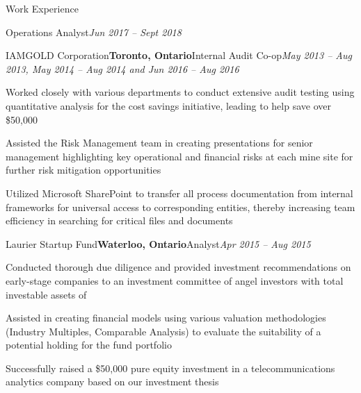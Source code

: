 \documentclass{resume} %
\begin{document}
\begin{rSection}{Work Experience}
\begin{pSubsection}{Operations Analyst}{\emph {Jun 2017 -- Sept 2018}}
\end{pSubsection}

\medskip

\begin{rSubsection}{IAMGOLD Corporation}{\bf Toronto, Ontario}{Internal Audit Co-op}{\emph {May 2013 -- Aug 2013, May 2014 -- Aug 2014 and Jun 2016 -- Aug 2016}}
\smallskip
\item Worked closely with various departments to conduct extensive audit testing using quantitative analysis for the cost savings initiative, leading to help save over \$50,000
\item Assisted the Risk Management team in creating presentations for senior management highlighting key operational and financial risks at each mine site for further risk mitigation opportunities
\item Utilized Microsoft SharePoint to transfer all process documentation from internal frameworks for universal access to corresponding entities, thereby increasing team efficiency in searching for critical files and documents 

\end{rSubsection}

\medskip

\begin{rSubsection}{Laurier Startup Fund}{\bf Waterloo, Ontario}{Analyst}{\emph {Apr 2015 -- Aug 2015}}
\smallskip
\item Conducted thorough due diligence and provided investment recommendations on early-stage companies to an investment committee of angel investors with total investable assets of 
\item Assisted in creating financial models using various valuation methodologies (Industry Multiples, Comparable Analysis) to evaluate the suitability of a potential holding for the fund portfolio
\item Successfully raised a \$50,000 pure equity investment in a telecommunications analytics company based on our investment thesis

\end{rSubsection}

\medskip


\end{rSection}
\end{document}
